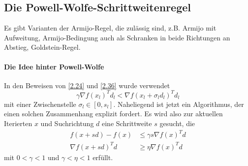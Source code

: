 \subsection{Die Powell-Wolfe-Schrittweitenregel}

Es gibt Varianten der Armijo-Regel, die zulässig sind, z.B. Armijo mit Aufweitung, Armijo-Bedingung auch als Schranken in beide Richtungen an Abstieg, Goldstein-Regel.

\paragraph{Die Idee hinter Powell-Wolfe}
In den Beweisen von \ref{2.24} und \ref{2.36} wurde verwendet
\[
	\gamma \nabla f(x_l)^T d_l
	< \nabla f(x_l + \sigma_l d_l)^T d_l
\]
mit einer Zwischenstelle $\sigma_l \in [0, s_l]$.
Naheliegend ist jetzt ein Algorithmus, der einen solchen Zusammenhang explizit fordert.
Es wird also zur aktuellen Iterierten $x$ und Suchrichtung $d$ eine Schrittweite $s$ gesucht, die
\begin{align*}
	f(x+sd) - f(x)
	&\le \gamma s \nabla f(x)^T d \\
	\nabla f(x+sd)^T d
	&\ge \eta \nabla f(x)^T d
\end{align*}
mit $0 < \gamma < 1$ und $\gamma < \eta < 1$ erfüllt.

\begin{alg} \label{alg:4}
	\begin{algorithmic}
		\Repeat
		\Repeat
		\Else
		\EndIf
		\EndWhile
	\end{algorithmic}
\end{alg}

